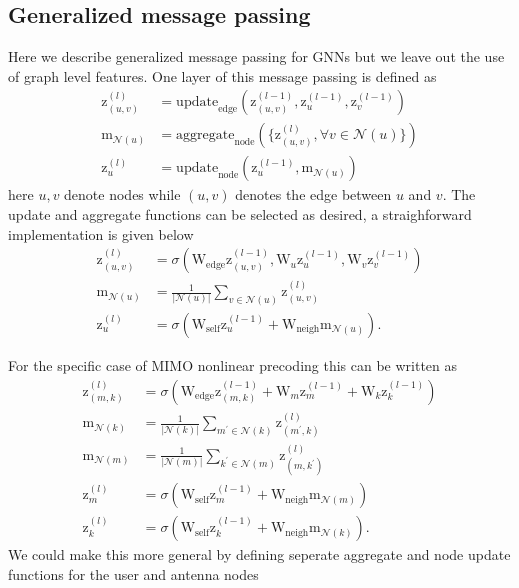 \documentclass[12pt]{article}
\newcommand{\vect}[1]{\boldsymbol{\mathrm{#1}}}
\newcommand{\mat}[1]{\boldsymbol{\mathrm{#1}}}
\theoremstyle{remark}
\begin{document}
\subsection{Generalized message passing}
Here we describe generalized message passing for GNNs but we leave out the use of graph level features. One layer of this message passing is defined as 
\begin{align}
	\vect{z}^{(l)}_{(u,v)} &= \mathrm{update}_{\mathrm{edge}}\left(\vect{z}_{(u,v)}^{(l-1)}, \vect{z}_u^{(l-1)}, \vect{z}_v^{(l-1)}\right)\\
	\vect{m}_{\mathcal{N}(u)} &= \mathrm{aggregate}_{\mathrm{node}}\left(\{\vect{z}_{(u,v)}^{(l)}, \forall v \in \mathcal{N}(u)\}\right)\\
	\vect{z}_{u}^{(l)} &= \mathrm{update}_{\mathrm{node}}\left(\vect{z}_u^{(l-1)}, \vect{m}_{\mathcal{N}(u)}\right)
\end{align}
here $u, v$ denote nodes while $(u,v)$ denotes the edge between $u$ and $v$. The update and aggregate functions can be selected as desired, a straighforward implementation is given below
\begin{align}
	\vect{z}^{(l)}_{(u,v)} &= \sigma\left(\mat{W}_{\mathrm{edge}} \vect{z}_{(u,v)}^{(l-1)}, \mat{W}_{u} \vect{z}_u^{(l-1)},    \mat{W}_{v} \vect{z}_v^{(l-1)} \right)\\
	\vect{m}_{\mathcal{N}(u)} &= \frac{1}{|\mathcal{N}(u)|} \sum_{v\in\mathcal{N}(u)} \vect{z}_{(u, v)}^{(l)}\\
	\vect{z}_{u}^{(l)} &= \sigma\left(\mat{W}_{\mathrm{self}} \vect{z}_u^{(l-1)} + \mat{W}_{\mathrm{neigh}} \vect{m}_{\mathcal{N}(u)}\right).
\end{align}

For the specific case of MIMO nonlinear precoding this can be written as 
\begin{align}
	\vect{z}^{(l)}_{(m,k)} &= \sigma\left(\mat{W}_{\mathrm{edge}} \vect{z}_{(m,k)}^{(l-1)}+ \mat{W}_{m} \vect{z}_m^{(l-1)}+    \mat{W}_{k} \vect{z}_k^{(l-1)} \right)\\
	\vect{m}_{\mathcal{N}(k)} &= \frac{1}{|\mathcal{N}(k)|} \sum_{m^{\prime}\in\mathcal{N}(k)} \vect{z}_{(m^{\prime}, k)}^{(l)}\\
	\vect{m}_{\mathcal{N}(m)} &= \frac{1}{|\mathcal{N}(m)|} \sum_{k^{\prime}\in\mathcal{N}(m)} \vect{z}_{(m, k^{\prime})}^{(l)}\\
	\vect{z}_{m}^{(l)} &= \sigma\left(\mat{W}_{\mathrm{self}} \vect{z}_m^{(l-1)} + \mat{W}_{\mathrm{neigh}} \vect{m}_{\mathcal{N}(m)}\right) \\
	\vect{z}_{k}^{(l)} &= \sigma\left(\mat{W}_{\mathrm{self}} \vect{z}_k^{(l-1)} + \mat{W}_{\mathrm{neigh}} \vect{m}_{\mathcal{N}(k)}\right).
\end{align}
We could make this more general by defining seperate aggregate and node update functions for the user and antenna nodes





\end{document}
